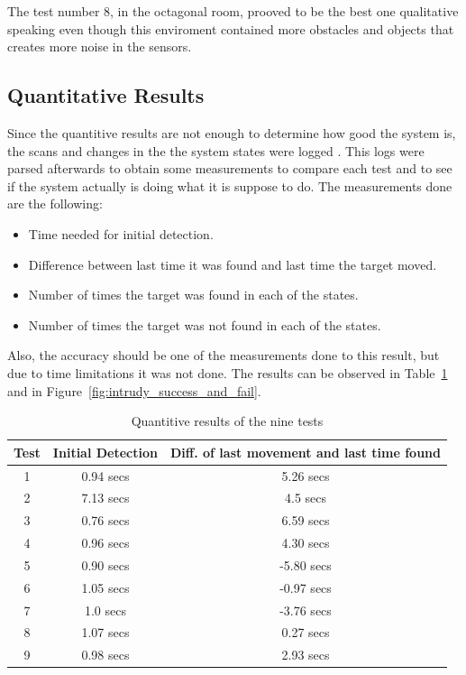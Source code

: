 \documentclass[12pt,a4paper]{scrartcl}
\begin{document}
		The test number 8, in the octagonal room, prooved to be the best one qualitative speaking even though this enviroment contained more obstacles and objects that creates more noise in the sensors.


		\subsection{Quantitative Results} %
		\label{sub:quantitative_results}

		Since the quantitive results are not enough to determine how good the system is, the scans and changes in the the system states were logged . This logs were parsed afterwards to obtain some measurements to compare each test and to see if the system actually is doing what it is suppose to do. The measurements done are the following: 
		\begin{itemize}
			\item Time needed for initial detection.
			\item Difference between last time it was found and last time the target moved.
			\item Number of times the target was found in each of the states.
			\item Number of times the target was not found in each of the states.
		\end{itemize}

		Also, the accuracy should be one of the measurements done to this result, but due to time limitations it was not done. The results can be observed in Table~\ref{tab:intrudy_quantitive_tests} and in Figure~\ref{fig:intrudy_success_and_fail}.

		\begin{table}
			\center
			\begin{tabular}{|c|c|c|}
				\hline 
				Test & Initial Detection & Diff. of last movement and last time found\tabularnewline
				\hline 
				\hline 
				1 & 0.94 secs & 5.26 secs\tabularnewline
				\hline 
				2 & 7.13 secs & 4.5 secs\tabularnewline
				\hline 
				3 & 0.76 secs & 6.59 secs\tabularnewline
				\hline 
				4 & 0.96 secs & 4.30 secs\tabularnewline
				\hline 
				5 & 0.90 secs & -5.80 secs\tabularnewline
				\hline 
				6 & 1.05 secs & -0.97 secs\tabularnewline
				\hline 
				7 & 1.0 secs & -3.76 secs\tabularnewline
				\hline 
				8 & 1.07 secs & 0.27 secs\tabularnewline
				\hline 
				9 & 0.98 secs & 2.93 secs\tabularnewline
				\hline 
			\end{tabular}
			\label{tab:intrudy_quantitive_tests}
		\caption{Quantitive results of the nine tests}
		\end{table}
		
\end{document}
